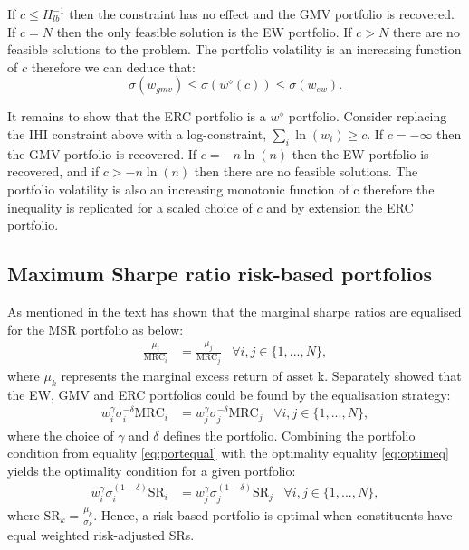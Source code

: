 \documentclass[
]{article}
\begin{document}
If \(c \leq H^{-1}_{lb}\) then the constraint has no effect and the GMV portfolio is recovered. If
\(c = N\) then the only feasible solution is the EW portfolio. If \(c > N\) there are no feasible
solutions to the problem. The portfolio volatility is an increasing function of \(c\) therefore we can
deduce that: \[\sigma(w_{gmv}) \leq \sigma(w^\diamond(c)) \leq \sigma (w_{ew}).\]

It remains to show that the ERC portfolio is a \(w^\diamond\) portfolio. Consider replacing the IHI
constraint above with a log-constraint, \(\sum_i \ln(w_i) \geq c\). If \(c = - \infty\) then the GMV
portfolio is recovered. If \(c = -n \ln(n)\) then the EW portfolio is recovered, and if \(c > -n\ln(n)\)
then there are no feasible solutions. The portfolio volatility is also an increasing monotonic
function of c therefore the inequality is replicated for a scaled choice of \(c\) and by extension the
ERC portfolio.

\hypertarget{msrrbport}{%
\subsection{Maximum Sharpe ratio risk-based portfolios}\label{msrrbport}}

As mentioned in the text \citet{S07} has shown that the marginal sharpe ratios are equalised for the MSR
portfolio as below:
\begin{align}
\frac{\mu_i}{\text{MRC}_i} & = \frac{\mu_j}{\text{MRC}_j} \;\;\; \forall i, j \in \{1, ..., N \}, \label{eq:optimeq}
\end{align}
where \(\mu_k\) represents the marginal excess return of asset k. Separately \citet{J13} showed that the
EW, GMV and ERC portfolios could be found by the equalisation strategy:
\begin{align}
w_i^\gamma \sigma^{-\delta}_i \text{MRC}_i & = w_j^\gamma \sigma^{-\delta}_j \text{MRC}_j \;\;\; \forall i, j \in \{1, ..., N \}, \label{eq:portequal}
\end{align}
where the choice of \(\gamma\) and \(\delta\) defines the portfolio. Combining the portfolio condition
from equality \eqref{eq:portequal} with the optimality equality \eqref{eq:optimeq} yields the optimality
condition for a given portfolio:
\begin{align}
w_i^\gamma \sigma_i^{(1- \delta)} \text{SR}_i & = w_j^\gamma \sigma_j^{(1- \delta)} \text{SR}_j \;\;\; \forall i, j \in \{1, ..., N \},
\end{align}
where \(\text{SR}_k = \frac{\mu_k}{\sigma_k}\). Hence, a risk-based portfolio is optimal when
constituents have equal weighted risk-adjusted SRs.
\end{document}
